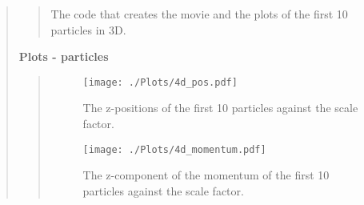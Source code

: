 \begin{quote}
\begin{quote}
The code that creates the movie and the plots of the first 10 particles in 3D. 

\end{quote}
\newpage


\textbf{Plots - particles}
\begin{quote}
\begin{figure}[!ht]
\centering
\texttt{[image: ./Plots/4d\_pos.pdf]}
\caption{The z-positions of the first 10 particles against the scale factor.}
\end{figure}

\begin{figure}[!ht]
\centering
\texttt{[image: ./Plots/4d\_momentum.pdf]}
\caption{The z-component of the momentum of the first 10 particles against the scale factor. }
\end{figure}
\end{quote}



\end{quote}




